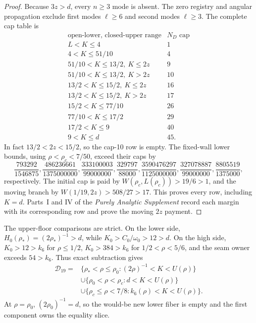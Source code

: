 \documentclass[11pt]{article}
\numberwithin{equation}{section}
\theoremstyle{definition}
\theoremstyle{remark}
\begin{document}
\begin{proof}
Because \(3z>d\), every \(n\geq3\) mode is absent.  The zero registry and
angular propagation exclude first modes \(\ell\geq6\) and second modes
\(\ell\geq3\).  The complete cap table is
\[
\begin{array}{c|c}
\text{open-lower, closed-upper range}&N_D\text{ cap}\\ \hline
L<K\leq4&1\\
4<K\leq51/10&4\\
51/10<K\leq13/2,\ K\leq2z&9\\
51/10<K\leq13/2,\ K>2z&10\\
13/2<K\leq15/2,\ K\leq2z&16\\
13/2<K\leq15/2,\ K>2z&17\\
15/2<K\leq77/10&26\\
77/10<K\leq17/2&29\\
17/2<K\leq9&40\\
9<K\leq d&45.
\end{array}
\]
In fact \(13/2<2z<15/2\), so the cap-10 row is empty.  The fixed-wall
lower bounds, using \(\rho<\rho_c<7/50\), exceed their caps by
\[
 \frac{793292}{1546875},\frac{486236661}{1375000000},
 \frac{333100003}{99000000},\frac{329797}{88000},
 \frac{3590476297}{1125000000},\frac{327078887}{99000000},
 \frac{8805519}{1375000},
\]
respectively.  The initial cap is paid by
\(W(\rho_c,L(\rho_c))>19/6>1\), and the moving branch by
\(W(1/19,2z)>508/27>17\).  This proves every row, including \(K=d\).
 Parts~I and IV of the \emph{Purely Analytic Supplement} record each margin
 with its corresponding row and prove the moving \(2z\) payment.
\end{proof}

The upper-floor comparisons are strict.  On the lower side,
\(H_0(\rho_*)=(2\rho_*)^{-1}>d\), while
\(K_0>C_0/\omega_0>12>d\).  On the high side, \(K_0>12>k_6\) for
\(\rho\leq1/2\), \(K_0>384>k_6\) for \(1/2<\rho<5/6\), and the seam
owner exceeds \(54>k_6\).  Thus exact subtraction gives
\begin{equation}
\boxed{\begin{aligned}
\mathcal D_{19}={}&
\{\rho_*<\rho\leq\rho_0:(2\rho)^{-1}<K<U(\rho)\}\\
&\cup\{\rho_0<\rho<\rho_c:d<K<U(\rho)\}\\
&\cup\{\rho_c\leq\rho<7/8:k_6(\rho)<K<U(\rho)\}.
\end{aligned}}
\label{cm:eq-D19}
\end{equation}
At \(\rho=\rho_0\), \((2\rho_0)^{-1}=d\), so the would-be new lower
fiber is empty and the first component owns the equality slice.
\end{document}
